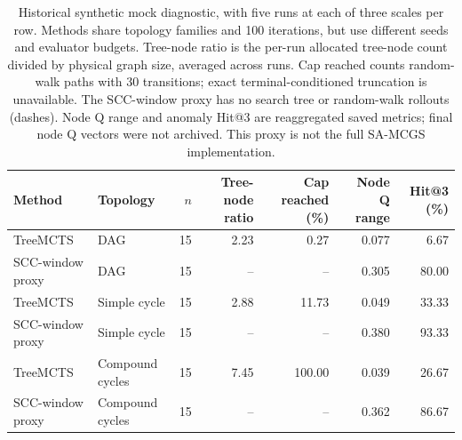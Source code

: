 \begin{table}[t]
\centering\small
\begin{tabular}{llrrrrr}
\toprule
Method & Topology & $n$ & Tree-node ratio & Cap reached (\%) & Node Q range & Hit@3 (\%) \\
\midrule
TreeMCTS & DAG & 15 & 2.23 & 0.27 & 0.077 & 6.67 \\
SCC-window proxy & DAG & 15 & -- & -- & 0.305 & 80.00 \\
TreeMCTS & Simple cycle & 15 & 2.88 & 11.73 & 0.049 & 33.33 \\
SCC-window proxy & Simple cycle & 15 & -- & -- & 0.380 & 93.33 \\
TreeMCTS & Compound cycles & 15 & 7.45 & 100.00 & 0.039 & 26.67 \\
SCC-window proxy & Compound cycles & 15 & -- & -- & 0.362 & 86.67 \\
\bottomrule
\end{tabular}
\caption{Historical synthetic mock diagnostic, with five runs at each of three scales per row. Methods share topology families and 100 iterations, but use different seeds and evaluator budgets. Tree-node ratio is the per-run allocated tree-node count divided by physical graph size, averaged across runs. Cap reached counts random-walk paths with 30 transitions; exact terminal-conditioned truncation is unavailable. The SCC-window proxy has no search tree or random-walk rollouts (dashes). Node Q range and anomaly Hit@3 are reaggregated saved metrics; final node Q vectors were not archived. This proxy is not the full SA-MCGS implementation.}
\label{tab:mock_audit_reconstructed}
\end{table}
